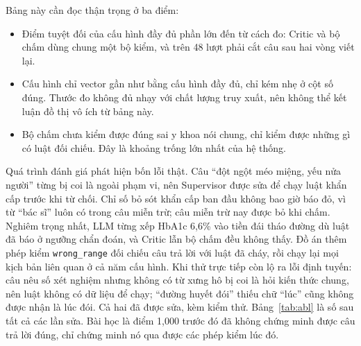 Bảng này cần đọc thận trọng ở ba điểm:

\begin{itemize}
  \item Điểm tuyệt đối của cấu hình đầy đủ phần lớn đến từ cách đo: Critic và bộ chấm dùng chung một bộ kiểm, và  trên 48 lượt phải cắt câu sau hai vòng viết lại.
  \item Cấu hình chỉ vector gần như bằng cấu hình đầy đủ, chỉ kém nhẹ ở cột số đúng. Thước đo không đủ nhạy với chất lượng truy xuất, nên không thể kết luận đồ thị vô ích từ bảng này.
  \item Bộ chấm chưa kiểm được đúng sai y khoa nói chung, chỉ kiểm được những gì có luật đối chiếu. Đây là khoảng trống lớn nhất của hệ thống.
\end{itemize}

Quá trình đánh giá phát hiện bốn lỗi thật. Câu “đột ngột méo miệng, yếu nửa người” từng bị coi là ngoài phạm vi, nên Supervisor được sửa để chạy luật khẩn cấp trước khi từ chối. Chỉ số bỏ sót khẩn cấp ban đầu không bao giờ báo đỏ, vì từ “bác sĩ” luôn có trong câu miễn trừ; câu miễn trừ nay được bỏ khi chấm. Nghiêm trọng nhất, LLM từng xếp HbA1c 6,6\% vào tiền đái tháo đường dù luật đã báo ở ngưỡng chẩn đoán, và Critic lẫn bộ chấm đều không thấy. Đồ án thêm phép kiểm \texttt{wrong\_range} đối chiếu câu trả lời với luật đã cháy, rồi chạy lại mọi kịch bản liên quan ở cả năm cấu hình. Khi thử trực tiếp còn lộ ra lỗi định tuyến: câu nêu số xét nghiệm nhưng không có từ xưng hô bị coi là hỏi kiến thức chung, nên luật không có dữ liệu để chạy; “đường huyết đói” thiếu chữ “lúc” cũng không được nhận là lúc đói. Cả hai đã được sửa, kèm kiểm thử. Bảng~\ref{tab:abl} là số sau tất cả các lần sửa. Bài học là điểm 1,000 trước đó đã không chứng minh được câu trả lời đúng, chỉ chứng minh nó qua được các phép kiểm lúc đó.
